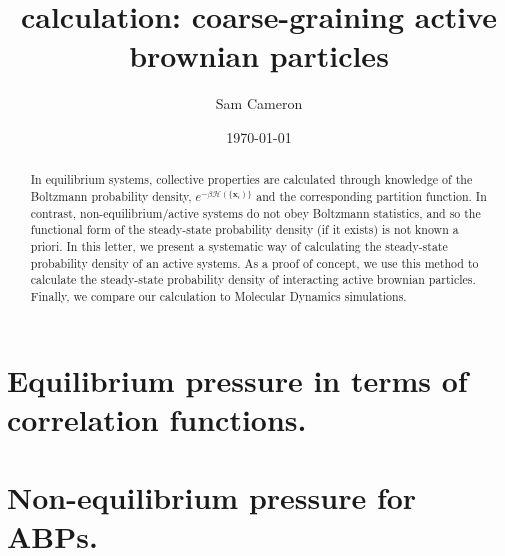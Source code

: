 \documentclass[twocolumn,amsmath,amssymb,aps]{revtex4-1}%
\begin{document}
 
\title{calculation: coarse-graining active brownian particles}
\author{Sam Cameron}
%
\date{\today}

\begin{abstract}
  In equilibrium systems, collective properties are calculated
  through knowledge of the Boltzmann probability density,
  $e^{-\beta \mathcal{H}(\{\bm{x}_i)\}}$ and the corresponding partition
  function. In contrast, non-equilibrium/active systems do not obey
  Boltzmann statistics, and so the functional form of the steady-state
  probability density (if it exists) is not known a priori. In this letter,
  we present a systematic way of calculating the steady-state
  probability density of an active systems. As a proof of concept, we use
  this method to calculate the steady-state probability density of
  interacting active brownian particles. Finally, we compare our calculation
  to Molecular Dynamics simulations.
\end{abstract}


\maketitle

\section{Equilibrium pressure in terms of correlation
 functions.\label{app:pressure}}



\section{Non-equilibrium pressure for ABPs.}





\end{document}
